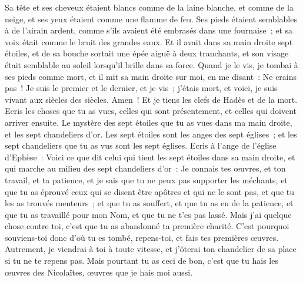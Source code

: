 \begin{multicols}{2}
Sa tête et ses cheveux étaient blancs comme de la laine blanche, et comme de la neige, et ses yeux étaient comme une flamme de feu.
Ses pieds étaient semblables à de l'airain ardent, comme s'ils avaient été embrasés dans une fournaise~; et sa voix était comme le bruit des grandes eaux.
Et il avait dans sa main droite sept étoiles, et de sa bouche sortait une épée aiguë à deux tranchants, et son visage était semblable au soleil lorsqu'il brille dans sa force.
Quand je le vis, je tombai à ses pieds comme mort, et il mit sa main droite sur moi, en me disant~: Ne crains pas~!
Je suis le premier et le dernier, et je vis~; j'étais mort, et voici, je suis vivant aux siècles des siècles. Amen~! Et je tiens les clefs de Hadès et de la mort.
Ecris les choses que tu as vues, celles qui sont présentement, et celles qui doivent arriver ensuite.
Le mystère des sept étoiles que tu as vues dans ma main droite, et les sept chandeliers d'or. Les sept étoiles sont les anges des sept églises~; et les sept chandeliers que tu as vus sont les sept églises.
\VerseOne{}Ecris à l'ange de l'église d'Ephèse~: Voici ce que dit celui qui tient les sept étoiles dans sa main droite, et qui marche au milieu des sept chandeliers d'or~:
Je connais tes œuvres, et ton travail, et ta patience, et je sais que tu ne peux pas supporter les méchants, et que tu as éprouvé ceux qui se disent être apôtres et qui ne le sont pas, et que tu les as trouvés menteurs~;
et que tu as souffert, et que tu as eu de la patience, et que tu as travaillé pour mon Nom, et que tu ne t'es pas lassé.
Mais j'ai quelque chose contre toi, c'est que tu as abandonné ta première charité.
C'est pourquoi souviens-toi donc d'où tu es tombé, repens-toi, et fais tes premières œuvres. Autrement, je viendrai à toi à toute vitesse, et j'ôterai ton chandelier de sa place si tu ne te repens pas.
Mais pourtant tu as ceci de bon, c'est que tu hais les œuvres des Nicolaïtes, œuvres que je hais moi aussi.

\end{multicols}
